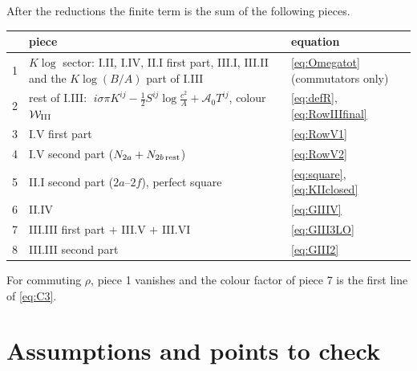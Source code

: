 \documentclass[10pt]{article}
\numberwithin{equation}{section}
\begin{document}
After the reductions the finite term is the sum of the following pieces.
\begin{center}
\renewcommand{\arraystretch}{1.35}
\begin{tabular}{l|l|l}
 & piece & equation\\ \hline
1 & $K\log$ sector: I.II, I.IV, II.I first part, III.I, III.II and the $K\log(B/A)$ part of I.III & \eqref{eq:Omegatot} (commutators only)\\
2 & rest of I.III: $\;i\sigma\pi K^{ij}-\tfrac12S^{ij}\log\frac{c^{2}}{A}+\mathcal{A}_{0}T^{ij}$, colour $\mathcal{W}_{\rm III}$ & \eqref{eq:defR}, \eqref{eq:RowIIIfinal}\\
3 & I.V first part & \eqref{eq:RowV1}\\
4 & I.V second part ($N_{2a}+N_{2b\,\rm rest}$) & \eqref{eq:RowV2}\\
5 & II.I second part ($2a$--$2f$), perfect square & \eqref{eq:square}, \eqref{eq:KIIclosed}\\
6 & II.IV & \eqref{eq:GIIIV}\\
7 & III.III first part $+$ III.V $+$ III.VI & \eqref{eq:GIII3LO}\\
8 & III.III second part & \eqref{eq:GIII2}
\end{tabular}
\end{center}
For commuting $\rho$, piece 1 vanishes and the colour factor of piece 7 is the first line of \eqref{eq:C3}.

\section{Assumptions and points to check}\label{sec:open}
\end{document}
